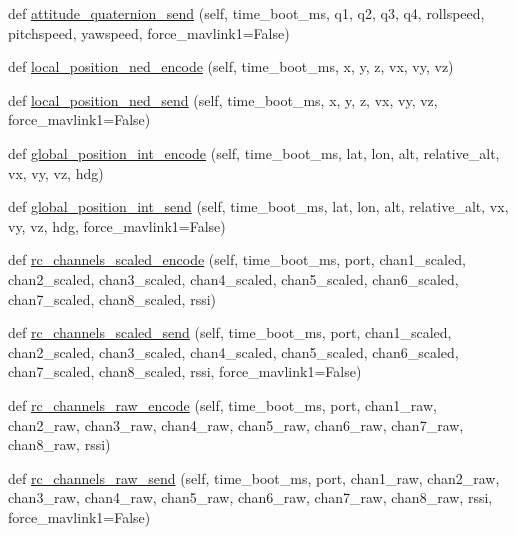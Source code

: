 \begin{DoxyCompactItemize}
\item 
def \hyperlink{classpymavlink_1_1dialects_1_1v10_1_1MAVLink_a77236be74cab4eb1f9cb33acd52a2eba}{attitude\+\_\+quaternion\+\_\+send} (self, time\+\_\+boot\+\_\+ms, q1, q2, q3, q4, rollspeed, pitchspeed, yawspeed, force\+\_\+mavlink1=False)
\item 
def \hyperlink{classpymavlink_1_1dialects_1_1v10_1_1MAVLink_a04bc0f5208fb7872becc7915cdc0b50a}{local\+\_\+position\+\_\+ned\+\_\+encode} (self, time\+\_\+boot\+\_\+ms, x, y, z, vx, vy, vz)
\item 
def \hyperlink{classpymavlink_1_1dialects_1_1v10_1_1MAVLink_a7aafc2f725a4dafe05f8cd8de24ddf7c}{local\+\_\+position\+\_\+ned\+\_\+send} (self, time\+\_\+boot\+\_\+ms, x, y, z, vx, vy, vz, force\+\_\+mavlink1=False)
\item 
def \hyperlink{classpymavlink_1_1dialects_1_1v10_1_1MAVLink_a1c9eef8b7ef80ba684e5d88527ce6773}{global\+\_\+position\+\_\+int\+\_\+encode} (self, time\+\_\+boot\+\_\+ms, lat, lon, alt, relative\+\_\+alt, vx, vy, vz, hdg)
\item 
def \hyperlink{classpymavlink_1_1dialects_1_1v10_1_1MAVLink_acdcec1ee12e614f8658dd5876e0ae7e2}{global\+\_\+position\+\_\+int\+\_\+send} (self, time\+\_\+boot\+\_\+ms, lat, lon, alt, relative\+\_\+alt, vx, vy, vz, hdg, force\+\_\+mavlink1=False)
\item 
def \hyperlink{classpymavlink_1_1dialects_1_1v10_1_1MAVLink_a338a8e9d2537f93697643d15f1fa28fa}{rc\+\_\+channels\+\_\+scaled\+\_\+encode} (self, time\+\_\+boot\+\_\+ms, port, chan1\+\_\+scaled, chan2\+\_\+scaled, chan3\+\_\+scaled, chan4\+\_\+scaled, chan5\+\_\+scaled, chan6\+\_\+scaled, chan7\+\_\+scaled, chan8\+\_\+scaled, rssi)
\item 
def \hyperlink{classpymavlink_1_1dialects_1_1v10_1_1MAVLink_a1fe588ae0be694b1aaf7b91cff278fce}{rc\+\_\+channels\+\_\+scaled\+\_\+send} (self, time\+\_\+boot\+\_\+ms, port, chan1\+\_\+scaled, chan2\+\_\+scaled, chan3\+\_\+scaled, chan4\+\_\+scaled, chan5\+\_\+scaled, chan6\+\_\+scaled, chan7\+\_\+scaled, chan8\+\_\+scaled, rssi, force\+\_\+mavlink1=False)
\item 
def \hyperlink{classpymavlink_1_1dialects_1_1v10_1_1MAVLink_a55de8bf4725245df29943c1fd3c066db}{rc\+\_\+channels\+\_\+raw\+\_\+encode} (self, time\+\_\+boot\+\_\+ms, port, chan1\+\_\+raw, chan2\+\_\+raw, chan3\+\_\+raw, chan4\+\_\+raw, chan5\+\_\+raw, chan6\+\_\+raw, chan7\+\_\+raw, chan8\+\_\+raw, rssi)
\item 
def \hyperlink{classpymavlink_1_1dialects_1_1v10_1_1MAVLink_a738d27c09050a6681143487337a142b4}{rc\+\_\+channels\+\_\+raw\+\_\+send} (self, time\+\_\+boot\+\_\+ms, port, chan1\+\_\+raw, chan2\+\_\+raw, chan3\+\_\+raw, chan4\+\_\+raw, chan5\+\_\+raw, chan6\+\_\+raw, chan7\+\_\+raw, chan8\+\_\+raw, rssi, force\+\_\+mavlink1=False)

\end{DoxyCompactItemize}
